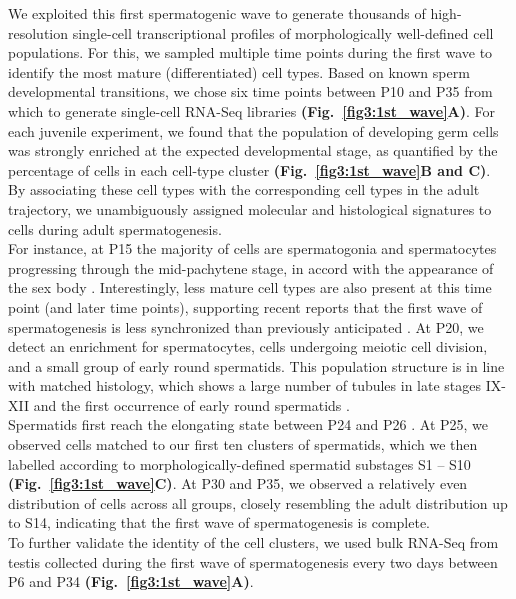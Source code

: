 We exploited this first spermatogenic wave to generate thousands of high-resolution single-cell transcriptional profiles of morphologically well-defined cell populations. For this, we sampled multiple time points during the first wave to identify the most mature (differentiated) cell types. Based on known sperm developmental transitions, we chose six time points between P10 and P35 from which to generate single-cell RNA-Seq libraries \textbf{(Fig.~\ref{fig3:1st_wave}A)}. For each juvenile experiment, we found that the population of developing germ cells was strongly enriched at the expected developmental stage, as quantified by the percentage of cells in each cell-type cluster \textbf{(Fig.~\ref{fig3:1st_wave}B and C)}. By associating these cell types with the corresponding cell types in the adult trajectory, we unambiguously assigned molecular and histological signatures to cells during adult spermatogenesis.\\

For instance, at P15 the majority of cells are spermatogonia and spermatocytes progressing through the mid-pachytene stage, in accord with the appearance of the sex body \citep{Turner2004}. Interestingly, less mature cell types are also present at this time point (and later time points), supporting recent reports that the first wave of spermatogenesis is less synchronized than previously anticipated \citep{Snyder2010}. At P20, we detect an enrichment for spermatocytes, cells undergoing meiotic cell division, and a small group of early round spermatids. This population structure is in line with matched histology, which shows a large number of tubules in late stages IX-XII and the first occurrence of early round spermatids \citep{Bellve1977}.\\
Spermatids first reach the elongating state between P24 and P26 \citep{Janca1986}. At P25, we observed cells matched to our first ten clusters of spermatids, which we then labelled according to morphologically-defined spermatid substages S1 – S10 \textbf{(Fig.~\ref{fig3:1st_wave}C)}. At P30 and P35, we observed a relatively even distribution of cells across all groups, closely resembling the adult distribution up to S14, indicating that the first wave of spermatogenesis is complete. \\

To further validate the identity of the cell clusters, we used bulk RNA-Seq from testis collected during the first wave of spermatogenesis every two days between P6 and P34 \textbf{(Fig.~\ref{fig3:1st_wave}A)}. 



